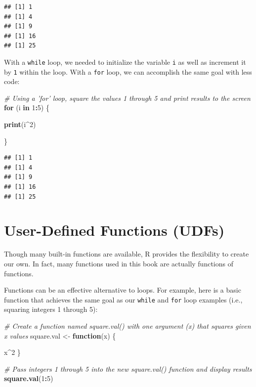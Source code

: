 \documentclass[]{book}
\newenvironment{Shaded}{\begin{snugshade}}{\end{snugshade}}
\newcommand{\CommentTok}[1]{\textcolor[rgb]{0.56,0.35,0.01}{\textit{#1}}}
\newcommand{\ControlFlowTok}[1]{\textcolor[rgb]{0.13,0.29,0.53}{\textbf{#1}}}
\newcommand{\DecValTok}[1]{\textcolor[rgb]{0.00,0.00,0.81}{#1}}
\newcommand{\KeywordTok}[1]{\textcolor[rgb]{0.13,0.29,0.53}{\textbf{#1}}}
\newcommand{\NormalTok}[1]{#1}
\newcommand{\OperatorTok}[1]{\textcolor[rgb]{0.81,0.36,0.00}{\textbf{#1}}}
\newcommand{\StringTok}[1]{\textcolor[rgb]{0.31,0.60,0.02}{#1}}
\begin{document}
\begin{verbatim}
## [1] 1
## [1] 4
## [1] 9
## [1] 16
## [1] 25
\end{verbatim}

With a \texttt{while} loop, we needed to initialize the variable \texttt{i} as well as increment it by \texttt{1} within the loop. With a \texttt{for} loop, we can accomplish the same goal with less code:

\begin{Shaded}
\begin{Highlighting}[]
\CommentTok{# Using a 'for' loop, square the values 1 through 5 and print results to the screen}
\ControlFlowTok{for}\NormalTok{ (i }\ControlFlowTok{in} \DecValTok{1}\OperatorTok{:}\DecValTok{5}\NormalTok{) \{ }
  
  \KeywordTok{print}\NormalTok{(i}\OperatorTok{^}\DecValTok{2}\NormalTok{)}
  
\NormalTok{\}}
\end{Highlighting}
\end{Shaded}

\begin{verbatim}
## [1] 1
## [1] 4
## [1] 9
## [1] 16
## [1] 25
\end{verbatim}

\hypertarget{user-defined-functions-udfs}{%
\section{User-Defined Functions (UDFs)}\label{user-defined-functions-udfs}}

Though many built-in functions are available, R provides the flexibility to create our own. In fact, many functions used in this book are actually functions of functions.

Functions can be an effective alternative to loops. For example, here is a basic function that achieves the same goal as our \texttt{while} and \texttt{for} loop examples (i.e., squaring integers 1 through 5):

\begin{Shaded}
\begin{Highlighting}[]
\CommentTok{# Create a function named square.val() with one argument (x) that squares given x values}
\NormalTok{square.val <-}\StringTok{ }\ControlFlowTok{function}\NormalTok{(x) \{}
  
\NormalTok{  x}\OperatorTok{^}\DecValTok{2}
\NormalTok{\}}

\CommentTok{# Pass integers 1 through 5 into the new square.val() function and display results}
\KeywordTok{square.val}\NormalTok{(}\DecValTok{1}\OperatorTok{:}\DecValTok{5}\NormalTok{)}
\end{Highlighting}
\end{Shaded}
\end{document}
